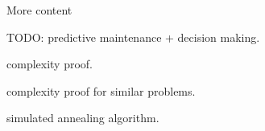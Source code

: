 \documentclass[usenames,dvipsnames]{beamer}
\begin{document}
\appendix

\begin{frame}{}
  \centering
  More content
\end{frame}

\begin{frame}{}
  \centering
  TODO: predictive maintenance + decision making.
\end{frame}

\begin{frame}{}
  \centering
  complexity proof.
\end{frame}

\begin{frame}{}
  \centering
  complexity proof for similar problems.
\end{frame}

\begin{frame}{}
  \centering
  simulated annealing algorithm.
\end{frame}


\end{document}
